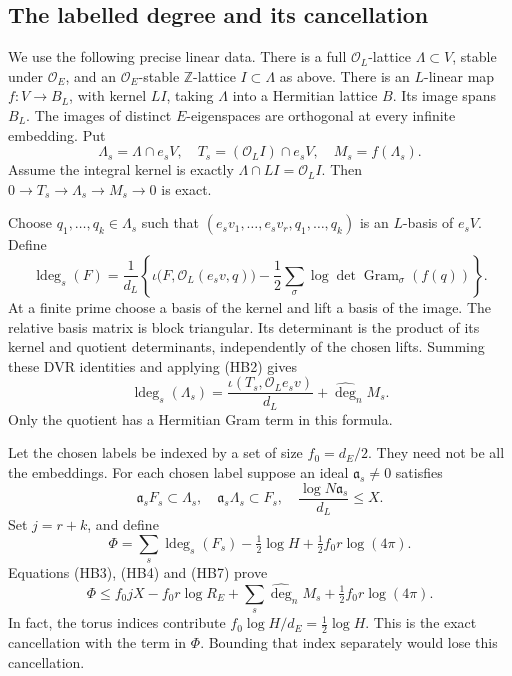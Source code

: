 \subsection{The labelled degree and its cancellation}

We use the following precise linear data.
There is a full \(\mathcal O_L\)-lattice \(\Lambda\subset V\),
stable under \(\mathcal O_E\), and an \(\mathcal O_E\)-stable
\(\mathbb Z\)-lattice \(I\subset\Lambda\) as above.
There is an \(L\)-linear map \(f:V\to B_L\), with kernel
\(L I\), taking \(\Lambda\) into a Hermitian lattice \(B\).
Its image spans \(B_L\).  The images of distinct \(E\)-eigenspaces
are orthogonal at every infinite embedding.
Put
\[
 \Lambda_s=\Lambda\cap e_sV,\quad
 T_s=(\mathcal O_L I)\cap e_sV,\quad
 M_s=f(\Lambda_s).
\]
Assume the integral kernel is exactly
\(\Lambda\cap LI=\mathcal O_L I\).
Then
\(0\to T_s\to\Lambda_s\to M_s\to0\) is exact.

Choose \(q_1,\ldots,q_k\in\Lambda_s\) such that
\((e_sv_1,\ldots,e_sv_r,q_1,\ldots,q_k)\) is an \(L\)-basis
of \(e_sV\).  Define
\[
 \operatorname{ldeg}_s(F)=\frac1{d_L}
 \left\{\iota\bigl(F,\mathcal O_L(e_sv,q)\bigr)
  -\frac12\sum_\sigma
           \log\det\operatorname{Gram}_{\sigma}(f(q))\right\}.
 \tag{HB6}
\]
At a finite prime choose a basis of the kernel and lift a basis
of the image.  The relative basis matrix is block triangular.
Its determinant is the product of its kernel and quotient
determinants, independently of the chosen lifts.
Summing these DVR identities and applying (HB2) gives
\[
 \operatorname{ldeg}_s(\Lambda_s)
 =\frac{\iota(T_s,\mathcal O_Le_sv)}{d_L}
                              +\widehat{\deg}_n M_s.
 \tag{HB7}
\]
Only the quotient has a Hermitian Gram term in this formula.

Let the chosen labels be indexed by a set of size
\(f_0=d_E/2\).  They need not be all the embeddings.
For each chosen label suppose an ideal \(\mathfrak a_s\ne0\)
satisfies
\[
 \mathfrak a_sF_s\subset\Lambda_s,\quad
 \mathfrak a_s\Lambda_s\subset F_s,\quad
              \frac{\log N\mathfrak a_s}{d_L}\le X.
 \tag{HB8}
\]
Set \(j=r+k\), and define
\[
 \Phi=\sum_s\operatorname{ldeg}_s(F_s)
                   -\tfrac12\log H+\tfrac12f_0r\log(4\pi).
\]
Equations (HB3), (HB4) and (HB7) prove
\[
 \Phi\le f_0jX-f_0r\log R_E
            +\sum_s\widehat{\deg}_n M_s
            +\tfrac12f_0r\log(4\pi).
 \tag{HB9}\label{eq:sr-hb-parts}
\]
In fact, the torus indices contribute
\(f_0\log H/d_E=\tfrac12\log H\).
This is the exact cancellation with the term in \(\Phi\).
Bounding that index separately would lose this cancellation.

